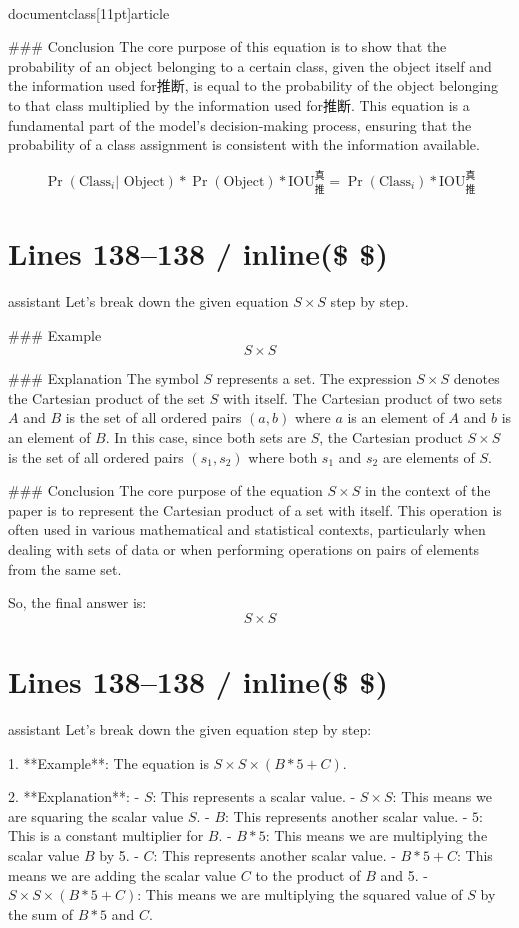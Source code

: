 \\documentclass[11pt]{article}
\begin{document}
### Conclusion
The core purpose of this equation is to show that the probability of an object belonging to a certain class, given the object itself and the information used for推断, is equal to the probability of the object belonging to that class multiplied by the information used for推断. This equation is a fundamental part of the model's decision-making process, ensuring that the probability of a class assignment is consistent with the information available.

\[
\boxed{\Pr(\textrm{Class}_i | \textrm{ Object}) * \Pr(\textrm{Object}) * \textrm{IOU}_{\textrm{推}}^{\textrm{真}} = \Pr(\textrm{Class}_i) * \textrm{IOU}_{\textrm{推}}^{\textrm{真}}}
\]


\section*{Lines 138–138 / inline(\$ \$) }
assistant
Let's break down the given equation \( S \times S \) step by step.

### Example
\[ S \times S \]

### Explanation
The symbol \( S \) represents a set. The expression \( S \times S \) denotes the Cartesian product of the set \( S \) with itself. The Cartesian product of two sets \( A \) and \( B \) is the set of all ordered pairs \((a, b)\) where \( a \) is an element of \( A \) and \( b \) is an element of \( B \). In this case, since both sets are \( S \), the Cartesian product \( S \times S \) is the set of all ordered pairs \((s_1, s_2)\) where both \( s_1 \) and \( s_2 \) are elements of \( S \).

### Conclusion
The core purpose of the equation \( S \times S \) in the context of the paper is to represent the Cartesian product of a set with itself. This operation is often used in various mathematical and statistical contexts, particularly when dealing with sets of data or when performing operations on pairs of elements from the same set.

So, the final answer is:
\[ \boxed{S \times S} \]


\section*{Lines 138–138 / inline(\$ \$) }
assistant
Let's break down the given equation step by step:

1. **Example**: The equation is \( S \times S \times (B*5 + C) \).

2. **Explanation**:
   - \( S \): This represents a scalar value.
   - \( S \times S \): This means we are squaring the scalar value \( S \).
   - \( B \): This represents another scalar value.
   - \( 5 \): This is a constant multiplier for \( B \).
   - \( B*5 \): This means we are multiplying the scalar value \( B \) by 5.
   - \( C \): This represents another scalar value.
   - \( B*5 + C \): This means we are adding the scalar value \( C \) to the product of \( B \) and 5.
   - \( S \times S \times (B*5 + C) \): This means we are multiplying the squared value of \( S \) by the sum of \( B*5 \) and \( C \).
\end{document}
